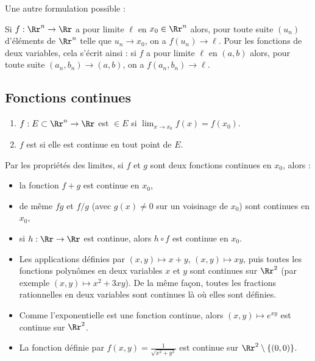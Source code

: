 \documentclass[11pt, class=report,crop=false]{standalone}
\begin{document}
\bigskip
\bigskip

Une autre formulation possible : 

Si $f : \Rr^n\to \Rr$ a pour limite $\ell$ en $x_0 \in \Rr^n$ alors,
pour toute suite $(u_n)$ d'éléments de $\Rr^n$ telle que $u_n \to x_0$, on a $f(u_n) \to \ell$. 
Pour les fonctions de deux variables, cela s'écrit ainsi :
si $f$ a pour limite $\ell$ en $(a,b)$ alors, pour toute suite
$(a_n,b_n) \to (a,b)$, on a $f(a_n,b_n) \to \ell$.


\subsection{Fonctions continues}


\begin{definition}
\sauteligne
\begin{enumerate}
\item $f : E \subset \Rr^n \rightarrow \Rr$ est  $\in E$ si $\displaystyle \lim_{x \rightarrow x_0} f(x) = f(x_0)$.
\item $f$ est  si elle est continue en tout point de $E$.
\end{enumerate}
\end{definition}

Par les propriétés des limites, si $f$ et $g$ sont deux fonctions continues en $x_0$, alors : 
\begin{itemize}
\item la fonction $f + g$ est continue en $x_0$,
\item de même $fg$ et $f/g$ (avec $g(x) \neq 0$ sur un voisinage de $x_0$)  sont continues en $x_0$,
\item si $h : \Rr \to \Rr$ est continue, alors $h \circ f$ est continue en $x_0$.
\end{itemize}

\begin{exemple}
\sauteligne
\begin{itemize}
  \item Les applications définies par $(x,y)\mapsto x+y$, $(x,y)\mapsto xy$, puis 
  toutes les fonctions polynômes en deux variables $x$ et $y$ sont continues sur $\Rr^2$ (par exemple $(x,y)\mapsto x^2+3xy$). De la même façon, toutes les fractions rationnelles 
  en deux variables sont continues là où elles sont définies.
  
  \item Comme l'exponentielle est une fonction continue, alors $(x,y)\mapsto e^{xy}$ est continue sur $\Rr^2$.
  
  \item La fonction définie par $f(x,y) = \frac{1}{\sqrt{x^2 + y^2}}$ est continue sur $\Rr^2\setminus\{(0,0)\}$.
\end{itemize}
\end{exemple}
  
\end{document}

